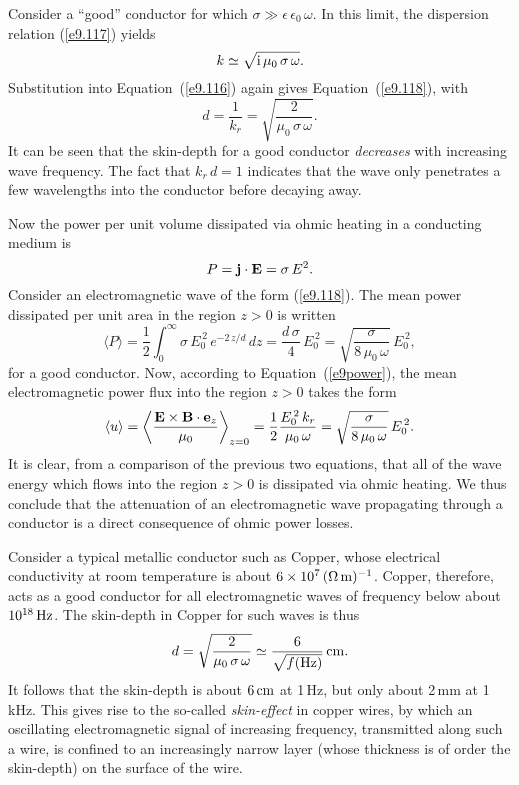 Consider a ``good'' conductor for which $\sigma\gg \epsilon\,\epsilon_0\,\omega$. In this limit, the dispersion relation 
(\ref{e9.117}) yields
\begin{equation}\label{ekgood}
k\simeq \sqrt{{\rm i}\,\mu_0\,\sigma\,\omega}.
\end{equation}
Substitution into Equation~(\ref{e9.116}) again gives Equation~(\ref{e9.118}),
with
\begin{equation}
d = \frac{1}{k_r} = \sqrt{\frac{2}{\mu_0\,\sigma\,\omega}}.
\end{equation}
It can be seen that the skin-depth for a good conductor {\em decreases}
with increasing wave frequency. The fact that $k_r\,d= 1$ indicates
that the wave only penetrates a few wavelengths into the conductor
before decaying away.

Now the power per unit volume dissipated via ohmic heating in
a conducting medium is
\begin{equation}
P = {\bf j}\cdot{\bf E} = \sigma\,E^2.
\end{equation}
Consider an electromagnetic wave of the form (\ref{e9.118}). The mean power dissipated 
per unit area in the region $z>0$ is written
\begin{equation}
\langle P\rangle = \frac{1}{2}\int_{0}^\infty
\sigma\,E_0^{\,2}\,e^{-2\,z/d}\,dz = \frac{d\,\sigma}{4}\,E_0^{\,2} =
\sqrt{\frac{\sigma}{8\,\mu_0\,\omega}}\,E_0^{\,2},
\end{equation}
for a good conductor.
Now, according to Equation~(\ref{e9power}), the mean electromagnetic
power flux into the region $z>0$ takes the form
\begin{equation}
\langle u\rangle = \left\langle \frac{{\bf E}\times{\bf B}\cdot{\bf e}_z}{\mu_0}\right\rangle_{z=0} = \frac{1}{2}\frac{E_0^{\,2}\,k_r}{\mu_0\,\omega} = \sqrt{\frac{\sigma}{8\,\mu_0\,\omega}}\,E_0^{\,2}.
\end{equation}
It is clear, from a comparison of the previous two equations, that
all of the wave energy which flows into the region $z>0$ is dissipated via ohmic
heating. We thus conclude that the attenuation of an electromagnetic
wave propagating through a conductor is a direct consequence of  ohmic power losses.

Consider a typical metallic conductor such as Copper, whose electrical
conductivity at room temperature  is about $6\times
10^{7}\,(\Omega\,{\rm m})^{-1}$. Copper, therefore, acts as a good
conductor for all electromagnetic waves of frequency below about
$10^{18}\,{\rm Hz}$. The skin-depth in Copper for such waves is thus
\begin{equation}
d = \sqrt{\frac{2}{\mu_0\,\sigma\,\omega}} \simeq \frac{6}{\sqrt{f({\rm Hz})}}\,{\rm cm}.
\end{equation}
It follows that the skin-depth is about $6\,{\rm cm}$ at 1\,Hz, but only about
2\,mm at 1\,kHz. This gives rise to the so-called {\em skin-effect}\/ in copper wires, by which an oscillating electromagnetic
signal of increasing frequency, transmitted along such a wire,  is confined
to an increasingly narrow layer (whose thickness is of order the skin-depth)
on the surface of the wire.

